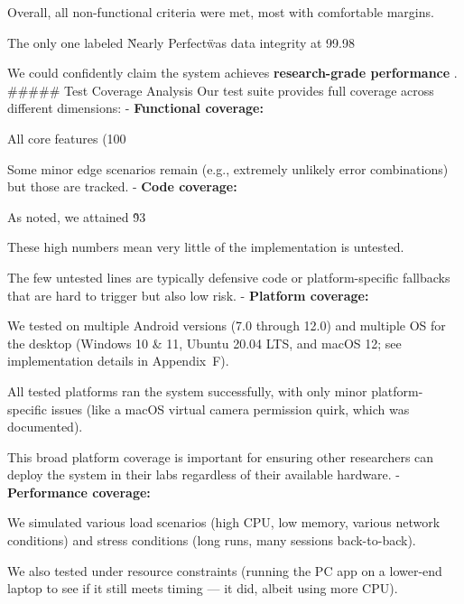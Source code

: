 {{{{{{{{{{{{{{{{Overall, all non-functional criteria were met, most with comfortable margins.

The only one labeled \"Nearly Perfect\" was data integrity at 99.98%

We could confidently claim the system achieves \textbf{research-grade performance}
. ##### Test Coverage Analysis Our test suite provides full coverage across different dimensions: - \textbf{Functional coverage:}

All core features (100%

Some minor edge scenarios remain (e.g., extremely unlikely error combinations) but those are tracked. - \textbf{Code coverage:}

As noted, we attained \~93%

These high numbers mean very little of the implementation is untested.

The few untested lines are typically defensive code or platform-specific fallbacks that are hard to trigger but also low risk. - \textbf{Platform coverage:}

We tested on multiple Android versions (7.0 through 12.0) and multiple OS for the desktop (Windows 10 \& 11, Ubuntu 20.04 LTS, and macOS 12; see implementation details in Appendix~F).

All tested platforms ran the system successfully, with only minor platform-specific issues (like a macOS virtual camera permission quirk, which was documented).

This broad platform coverage is important for ensuring other researchers can deploy the system in their labs regardless of their available hardware. - \textbf{Performance coverage:}

We simulated various load scenarios (high CPU, low memory, various network conditions) and stress conditions (long runs, many sessions back-to-back).

We also tested under resource constraints (running the PC app on a lower-end laptop to see if it still meets timing --- it did, albeit using more CPU).

}}}}}}}}}}}}}}}}
